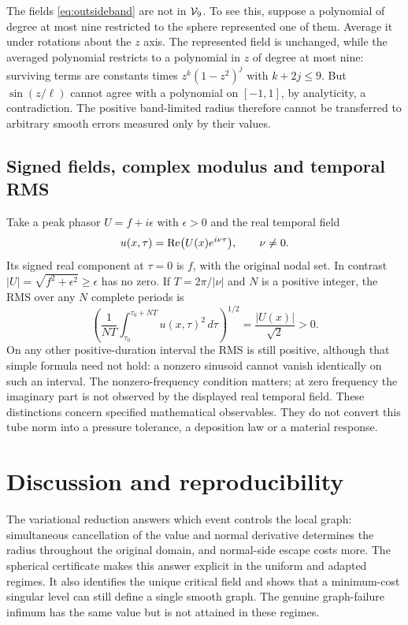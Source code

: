 \documentclass[11pt,a4paper]{article}
\begin{document}
The fields \eqref{eq:outsideband} are not in $\mathcal V_9$. To see this,
suppose a polynomial of degree at most nine restricted to the sphere
represented one of them. Average it under rotations about the $z$
axis. The represented field is unchanged, while the averaged polynomial
restricts to a polynomial in $z$ of degree at most nine: surviving
terms are constants times $z^k(1-z^2)^j$ with $k+2j\le9$.
But $\sin(z/\ell)$ cannot agree with a polynomial on $[-1,1]$,
by analyticity, a contradiction. The positive band-limited radius
therefore cannot be transferred to arbitrary smooth errors measured
only by their values.

\subsection{Signed fields, complex modulus and temporal RMS}
Take a peak phasor $U=f+i\epsilon$ with $\epsilon>0$ and the
real temporal field
\[
 u(x,\tau)=\mathop{\rm Re}\bigl(U(x)e^{i\nu\tau}\bigr),
 \qquad \nu\ne0.
\]
Its signed real component at $\tau=0$ is $f$, with the original
nodal set. In contrast $|U|=\sqrt{f^2+\epsilon^2}\ge\epsilon$
has no zero. If $T=2\pi/|\nu|$ and $N$ is a positive integer,
the RMS over any $N$ complete periods is
\[
 \left(\frac{1}{NT}\int_{\tau_0}^{\tau_0+NT}
           u(x,\tau)^2\,d\tau\right)^{1/2}
 =\frac{|U(x)|}{\sqrt2}>0.
\]
On any other positive-duration interval the RMS is still positive,
although that simple formula need not hold: a nonzero sinusoid
cannot vanish identically on such an interval. The nonzero-frequency
condition matters; at zero frequency the imaginary part is not observed
by the displayed real temporal field. These distinctions concern
specified mathematical observables. They do not convert this tube
norm into a pressure tolerance, a deposition law or a material response.

\section{Discussion and reproducibility}\label{sec:discussion}

The variational reduction answers which event controls the local graph:
simultaneous cancellation of the value and normal derivative determines
the radius throughout the original domain, and normal-side escape costs
more. The spherical certificate makes this answer explicit in the uniform
and adapted regimes. It also identifies the unique critical field and
shows that a minimum-cost singular level can still define a single smooth
graph. The genuine graph-failure infimum has the same value but is not
attained in these regimes.
\end{document}
